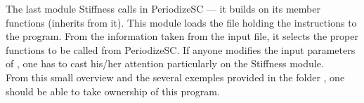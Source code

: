 \documentclass{article}
\begin{document}
The last module Stiffness calls in PeriodizeSC --- it builds on its member functions (inherits from it). This module loads the  file holding the instructions to the program. From the information taken from the input file, it selects the proper functions to be called from PeriodizeSC. If anyone modifies the input parameters of , one has to cast his/her attention particularly on the Stiffness module.\\

From this small overview and the several exemples provided in the folder , one should be able to take ownership of this program.



\nocite{*}

 
%
\end{document}
